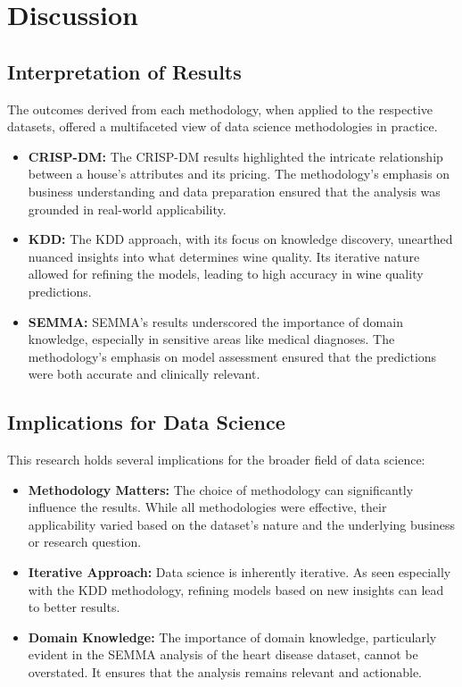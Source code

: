 \documentclass{article}
\begin{document}
\section{Discussion}

\subsection{Interpretation of Results}
The outcomes derived from each methodology, when applied to the respective datasets, offered a multifaceted view of data science methodologies in practice.

\begin{itemize}
    \item \textbf{CRISP-DM:} The CRISP-DM results highlighted the intricate relationship between a house's attributes and its pricing. The methodology's emphasis on business understanding and data preparation ensured that the analysis was grounded in real-world applicability.
    
    \item \textbf{KDD:} The KDD approach, with its focus on knowledge discovery, unearthed nuanced insights into what determines wine quality. Its iterative nature allowed for refining the models, leading to high accuracy in wine quality predictions.
    
    \item \textbf{SEMMA:} SEMMA's results underscored the importance of domain knowledge, especially in sensitive areas like medical diagnoses. The methodology's emphasis on model assessment ensured that the predictions were both accurate and clinically relevant.
\end{itemize}

\subsection{Implications for Data Science}
This research holds several implications for the broader field of data science:

\begin{itemize}
    \item \textbf{Methodology Matters:} The choice of methodology can significantly influence the results. While all methodologies were effective, their applicability varied based on the dataset's nature and the underlying business or research question.
    
    \item \textbf{Iterative Approach:} Data science is inherently iterative. As seen especially with the KDD methodology, refining models based on new insights can lead to better results.
    
    \item \textbf{Domain Knowledge:} The importance of domain knowledge, particularly evident in the SEMMA analysis of the heart disease dataset, cannot be overstated. It ensures that the analysis remains relevant and actionable.
\end{itemize}
\end{document}

